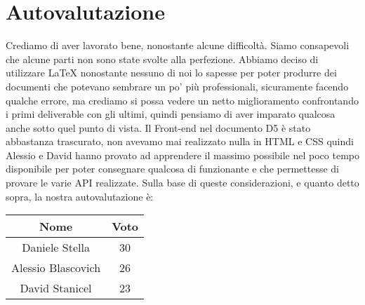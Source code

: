 \documentclass{article}
\begin{document}
   \section{Autovalutazione}
   Crediamo di aver lavorato bene, nonostante alcune difficoltà. Siamo consapevoli che alcune parti non sono state svolte alla perfezione. Abbiamo deciso di utilizzare LaTeX nonostante nessuno di noi lo sapesse per poter produrre dei documenti che potevano sembrare un po’ più professionali, sicuramente facendo qualche errore, ma crediamo si possa vedere un netto miglioramento confrontando i primi deliverable con gli ultimi, quindi pensiamo di aver imparato qualcosa anche sotto quel punto di vista. Il Front-end nel documento D5 è stato abbastanza trascurato, non avevamo mai realizzato nulla in HTML e CSS quindi Alessio e David hanno provato ad apprendere il massimo possibile nel poco tempo disponibile per poter consegnare qualcosa di funzionante e che permettesse di provare le varie API realizzate.
   Sulla base di queste considerazioni, e quanto detto sopra, la nostra autovalutazione è:


   
   \begin{tabular}{|c|c|}
      \hline
      Nome & Voto\\
      \hline
      Daniele Stella & 30 \\
      \hline
      Alessio Blascovich & 26\\
      \hline
      David Stanicel & 23\\
      \hline
   \end{tabular}
\end{document}
